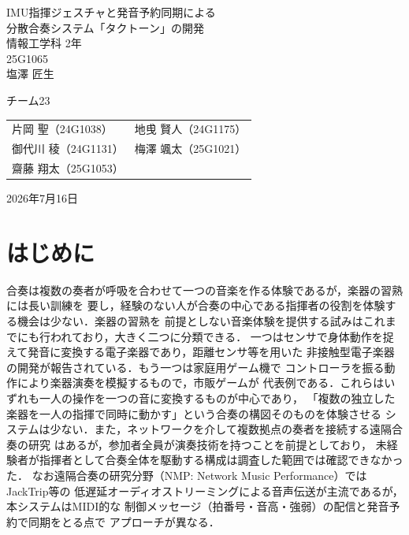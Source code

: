 \documentclass[uplatex,dvipdfmx]{jlreq}
\begin{document}
\begin{titlepage}
\vspace*{1cm}
\centering
{\huge\textsf{IMU指揮ジェスチャと発音予約同期による}\\[10pt]
\huge\textsf{分散合奏システム「タクトーン」の開発}}\\[1.6cm]
\Large\textsf{情報工学科 2年}\\
\Large\textsf{25G1065}\\[5pt]
\huge\textsf{塩澤 匠生}

\vspace*{1cm}
\Large\sffamily
\begin{itembox}[c]{チーム23}
\centering
\begin{tabular}{ll}
片岡 聖（24G1038）&
地曵 賢人（24G1175）\\
御代川 稜（24G1131）&
梅澤 颯太（25G1021）\\
齋藤 翔太（25G1053）&\\
\end{tabular}
\end{itembox}

\vspace*{1cm}
\Large\textsf{2026年7月16日}
\end{titlepage}
\clearpage

\section{はじめに}\label{sec:intro}

合奏は複数の奏者が呼吸を合わせて一つの音楽を作る体験であるが，楽器の習熟には長い訓練を
要し，経験のない人が合奏の中心である指揮者の役割を体験する機会は少ない．楽器の習熟を
前提としない音楽体験を提供する試みはこれまでにも行われており，大きく二つに分類できる．
一つはセンサで身体動作を捉えて発音に変換する電子楽器であり，距離センサ等を用いた
非接触型電子楽器の開発\cite{teru}が報告されている．もう一つは家庭用ゲーム機で
コントローラを振る動作により楽器演奏を模擬するもので，市販ゲーム\cite{ninntenndo}が
代表例である．これらはいずれも一人の操作を一つの音に変換するものが中心であり，
「複数の独立した楽器を一人の指揮で同時に動かす」という合奏の構図そのものを体験させる
システムは少ない．また，ネットワークを介して複数拠点の奏者を接続する遠隔合奏の研究
\cite{ref:chien}はあるが，参加者全員が演奏技術を持つことを前提としており，
未経験者が指揮者として合奏全体を駆動する構成は調査した範囲では確認できなかった．
なお遠隔合奏の研究分野（NMP: Network Music Performance）ではJackTrip等の
低遅延オーディオストリーミングによる音声伝送が主流であるが，本システムはMIDI的な
制御メッセージ（拍番号・音高・強弱）の配信と発音予約で同期をとる点で
アプローチが異なる．
\end{document}
